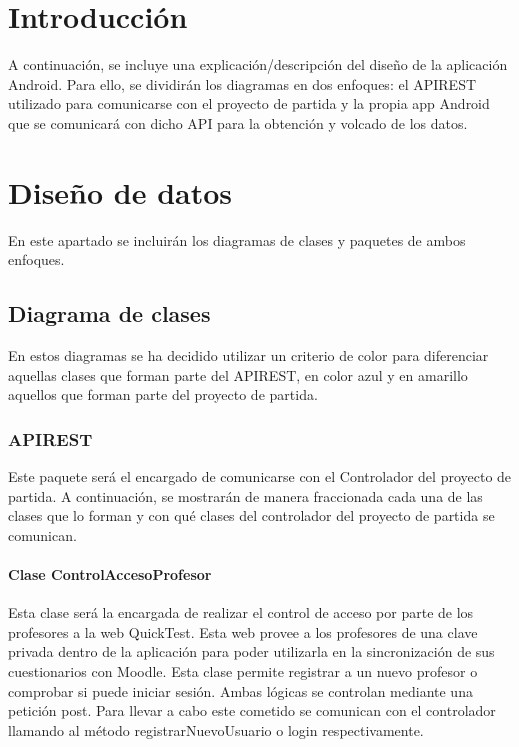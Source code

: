 
\section{Introducción}

A continuación, se incluye una explicación/descripción del diseño de la aplicación Android. Para ello, se dividirán los diagramas en dos enfoques: el APIREST utilizado para comunicarse con el proyecto de partida y la propia app Android que se comunicará con dicho API para la obtención y volcado de los datos.

\section{Diseño de datos}

En este apartado se incluirán los diagramas de clases y paquetes de ambos enfoques.

\subsection{Diagrama de clases}

En estos diagramas se ha decidido utilizar un criterio de color para diferenciar aquellas clases que forman parte del APIREST, en color azul y en amarillo aquellos que forman parte del proyecto de partida.

\subsubsection{APIREST}

Este paquete será el encargado de comunicarse con el Controlador del proyecto de partida. A continuación, se mostrarán de manera fraccionada cada una de las clases que lo forman y con qué clases del controlador del proyecto de partida se comunican.

\paragraph{Clase ControlAccesoProfesor}

Esta clase será la encargada de realizar el control de acceso por parte de los profesores a la web QuickTest. Esta web provee a los profesores de una clave privada dentro de la aplicación para poder utilizarla en la sincronización de sus cuestionarios con Moodle. Esta clase permite registrar a un nuevo profesor o comprobar si puede iniciar sesión. Ambas lógicas se controlan mediante una petición post. Para llevar a cabo este cometido se comunican con el controlador llamando al método registrarNuevoUsuario o login respectivamente.

